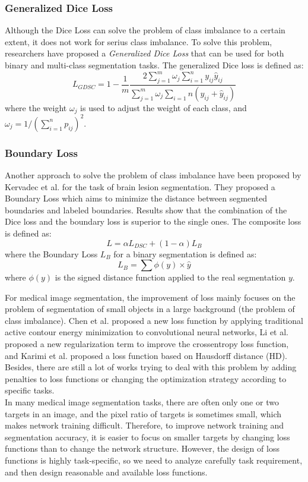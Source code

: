 \subsubsection{Generalized Dice Loss}
Although the Dice Loss can solve the problem of class imbalance to a certain extent, it does not work for serius class imbalance.
To solve this problem, researchers have proposed a \emph{Generalized Dice Loss} that can be used for both binary and multi-class segmentation tasks. The generalized Dice loss is defined as:
$$
L_{GDSC} = 1 - \frac{1}{m}\frac{2\sum_{j=1}^{m} \omega_j
\sum_{i=1}^{n}y_{ij}\hat{y}_{ij}}{\sum_{j=1}^{m}\omega_j\sum_{i=1}{n}(y_{ij} +
\hat{y}_{ij})}
$$
where the weight $\omega_j$ is used to adjust the weight of each class, and $\omega_j = 1/(\sum_{i=1}^{n}p_{ij})^2$.

\subsubsection{Boundary Loss}
Another approach to solve the problem of class imbalance have been proposed by Kervadec et al. for the task of brain lesion segmentation. They proposed a Boundary Loss which aims to minimize the distance between segmented boundaries and labeled boundaries. Results show that the combination of the Dice loss and the boundary loss is superior to the single ones. The composite loss is defined as:
$$
L = \alpha L_{DSC} + (1 - \alpha) L_{B}
$$
where the Boundary Loss $L_{B}$ for a binary segmentation is defined as:
$$
L_{B} = \sum \phi(y) \times \hat{y}
$$
where $\phi(y)$ is the signed distance function applied to the real segmentation $y$.

\par
For medical image segmentation, the improvement of loss mainly focuses on the
problem of segmentation of small objects in a large background (the problem of
class imbalance). Chen et al. proposed a new loss function by applying
traditional active contour energy minimization to convolutional neural networks,
Li et al. proposed a new regularization term to improve the crossentropy loss
function, and Karimi et al. proposed a loss function based on Hausdorff
distance (HD). Besides, there are still a lot of works trying to deal with this
problem by adding penalties to loss functions or changing the optimization
strategy according to specific tasks.\\
In many medical image segmentation tasks, there are often only one or two
targets in an image, and the pixel ratio of targets is sometimes small, which
makes network training difficult. Therefore, to improve network training and
segmentation accuracy, it is easier to focus on smaller targets by changing loss
functions than to change the network structure. However, the design of loss
functions is highly task-specific, so we need to analyze carefully task
requirement, and then design reasonable and available loss functions.

